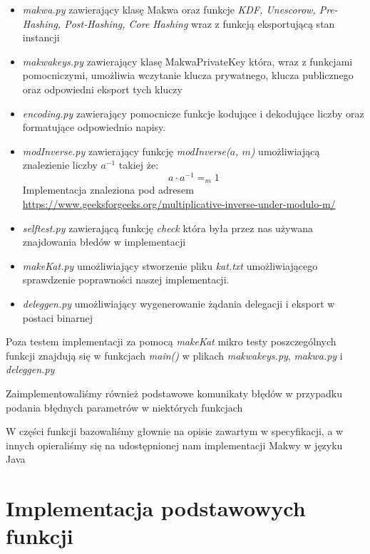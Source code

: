 \documentclass[a4paper,titleauthor]{mwart}
\begin{document}
\begin{itemize}
	\item \textit{makwa.py} zawierający klasę Makwa oraz funkcje \textit{KDF, Unescorow, Pre-Hashing, Post-Hashing, Core Hashing} wraz z funkcją eksportującą stan instancji
	\item \textit{makwakeys.py} zawierający klasę MakwaPrivateKey która, wraz z funkcjami pomocniczymi, umożliwia wczytanie klucza prywatnego, klucza publicznego oraz odpowiedni eksport tych kluczy
	\item \textit{encoding.py} zawierający pomocnicze funkcje kodujące i dekodujące liczby oraz formatujące odpowiednio napisy.
	\item \textit{modInverse.py} zawierający funkcję \textit{modInverse($a$, $m$)} umożliwiającą znalezienie liczby $a^{-1}$ takiej że: $$a\cdot a^{-1}=_m1$$
	Implementacja znaleziona pod adresem \url{https://www.geeksforgeeks.org/multiplicative-inverse-under-modulo-m/}
	\item \textit{selftest.py} zawierającą funkcję \textit{check} która była przez nas używana znajdowania błedów w implementacji
	\item \textit{makeKat.py} umożliwiający stworzenie pliku \textit{kat.txt} umożliwiającego sprawdzenie poprawności naszej implementacji.
	\item \textit{deleggen.py} umożliwiający wygenerowanie żądania delegacji i eksport w postaci binarnej
\end{itemize}
Poza testem implementacji za pomocą \textit{makeKat} mikro testy poszczególnych funkcji znajdują się w funkcjach \textit{main()} w plikach \textit{makwakeys.py}, \textit{makwa.py} i \textit{deleggen.py}

Zaimplementowaliśmy również podstawowe komunikaty błędów w przypadku podania błędnych parametrów w niektórych funkcjach

W części funkcji bazowaliśmy głownie na opisie zawartym w specyfikacji, a w innych opieraliśmy się na udostępnionej nam implementacji Makwy w języku Java
\section{Implementacja podstawowych funkcji}
\end{document}
